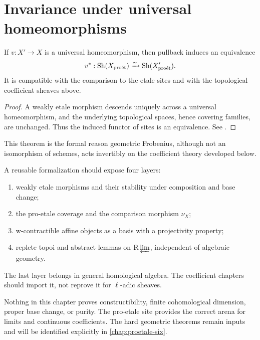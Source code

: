 \section{Invariance under universal homeomorphisms}

\begin{theorem}
\label{thm:proetale-universal-homeomorphism}
If \(v:X'\to X\) is a universal homeomorphism, then pullback induces an
equivalence
\[
  v^*:\operatorname{Sh}(X_{\mathrm{pro\acute et}})
      \xrightarrow{\sim}
      \operatorname{Sh}(X'_{\mathrm{pro\acute et}}).
\]
It is compatible with the comparison to the etale sites and with the
topological coefficient sheaves above.
\end{theorem}

\begin{proof}
A weakly etale morphism descends uniquely across a universal homeomorphism,
and the underlying topological spaces, hence covering families, are
unchanged.  Thus the induced functor of sites is an equivalence.  See
\cite[Lemma~5.4.2]{BhattScholzeProEtale}.
\end{proof}

This theorem is the formal reason geometric Frobenius, although not an
isomorphism of schemes, acts invertibly on the coefficient theory developed
below.

\begin{formalization}
A reusable formalization should expose four layers:
\begin{enumerate}
\item weakly etale morphisms and their stability under composition and base
      change;
\item the pro-etale coverage and the comparison morphism \(\nu_X\);
\item w-contractible affine objects as a basis with a projectivity property;
\item replete topoi and abstract lemmas on \(\mathrm R\varprojlim\), independent of
      algebraic geometry.
\end{enumerate}
The last layer belongs in general homological algebra.  The coefficient
chapters should import it, not reprove it for \(\ell\)-adic sheaves.
\end{formalization}

\begin{auditbox}
Nothing in this chapter proves constructibility, finite cohomological
dimension, proper base change, or purity.  The pro-etale site provides the
correct arena for limits and continuous coefficients.  The hard geometric
theorems remain inputs and will be identified explicitly in
\cref{chap:proetale-six}.
\end{auditbox}

